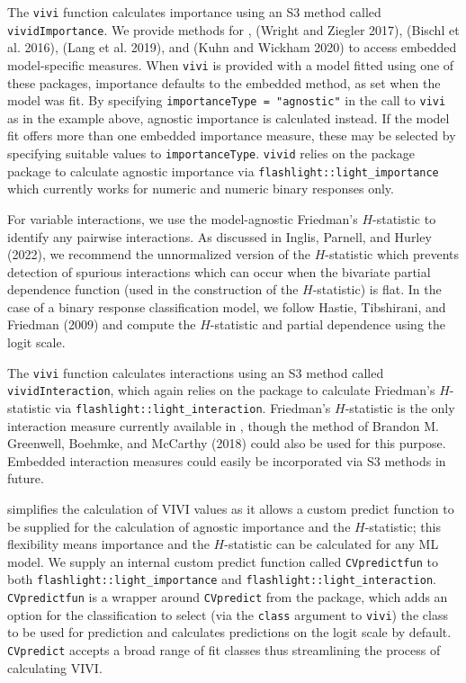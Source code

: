 The \texttt{vivi} function calculates importance using an S3 method called \texttt{vividImportance}. We provide methods for ,
 (Wright and Ziegler 2017),  (Bischl et al. 2016),  (Lang et al. 2019), and  (Kuhn and Wickham 2020) to access embedded model-specific measures. When \texttt{vivi} is provided with a model fitted using one of these packages, importance defaults to the embedded method, as set when the model was fit. By specifying \texttt{importanceType\ =\ "agnostic"} in the call to \texttt{vivi} as in the example above, agnostic importance is calculated instead. If the model fit offers more than one embedded importance measure, these may be selected by specifying suitable values to \texttt{importanceType}.
\texttt{vivid} relies on the package  package to calculate agnostic importance via \texttt{flashlight::light\_importance} which currently works for numeric and numeric binary responses only.

For variable interactions, we use the model-agnostic Friedman's \(H\)-statistic to identify any pairwise interactions. As discussed in Inglis, Parnell, and Hurley (2022), we recommend the unnormalized version of the \(H\)-statistic which prevents detection of spurious interactions which can occur when the bivariate partial dependence function (used in the construction of the \(H\)-statistic) is flat. In the case of a binary response classification model, we follow Hastie, Tibshirani, and Friedman (2009) and compute the \(H\)-statistic and partial dependence using the logit scale.

The \texttt{vivi} function calculates interactions using an S3 method called \texttt{vividInteraction}, which again relies on the  package to calculate Friedman's \(H\)-statistic via
\texttt{flashlight::light\_interaction}. Friedman's \(H\)-statistic is the only interaction measure currently available in , though the method of Brandon M. Greenwell, Boehmke, and McCarthy (2018) could also be used for this purpose. Embedded interaction measures could easily be incorporated via S3 methods in future.

 simplifies the calculation of VIVI values
as it allows a custom predict function to be supplied for the calculation of agnostic importance and the \(H\)-statistic; this flexibility means importance and the \(H\)-statistic can be calculated for any ML model.
We supply an internal custom predict function called \texttt{CVpredictfun} to both \texttt{flashlight::light\_importance} and \texttt{flashlight::light\_interaction}. \texttt{CVpredictfun} is a wrapper around \texttt{CVpredict} from the  package, which adds an option for the classification to select (via the \texttt{class} argument to \texttt{vivi}) the class to be used for prediction and calculates predictions on the logit scale by default.
\texttt{CVpredict} accepts a broad range of fit classes thus streamlining the process of calculating VIVI.

